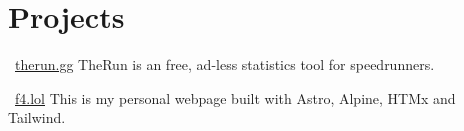 \section{Projects}

\resumeSubHeadingListStart

	\resumeSubheading
		{\faGlobe \ \href{https://therun.gg}{\underline{therun.gg}}}{}
		{\qquad TheRun is an free, ad-less statistics tool for speedrunners.}{}
		\resumeItemListStart
		\resumeItemListEnd

	\resumeSubheading
		{\faGlobe \ \href{https://f4.lol}{\underline{f4.lol}}}{}
		{\qquad This is my personal webpage built with Astro, Alpine, HTMx and Tailwind.}{}
		\resumeItemListStart
		\resumeItemListEnd

\resumeSubHeadingListEnd